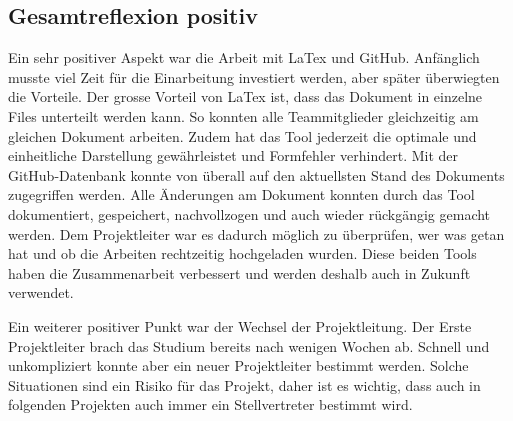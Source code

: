 \subsection{Gesamtreflexion positiv}
\par Ein sehr positiver Aspekt war die Arbeit mit LaTex und GitHub. Anfänglich musste viel Zeit für die Einarbeitung investiert werden, aber später überwiegten die Vorteile. Der grosse Vorteil von LaTex ist, dass das Dokument in einzelne Files unterteilt werden kann. So konnten alle Teammitglieder gleichzeitig am gleichen Dokument arbeiten. Zudem hat das Tool jederzeit die optimale und einheitliche Darstellung gewährleistet und Formfehler verhindert. Mit der GitHub-Datenbank konnte von überall auf den aktuellsten Stand des Dokuments zugegriffen werden. Alle Änderungen am Dokument konnten durch das Tool dokumentiert, gespeichert, nachvollzogen und auch wieder rückgängig gemacht werden. Dem Projektleiter war es dadurch möglich zu überprüfen, wer was getan hat und ob die Arbeiten rechtzeitig hochgeladen wurden. Diese beiden Tools haben die Zusammenarbeit verbessert und werden deshalb auch in Zukunft verwendet.
\par Ein weiterer positiver Punkt war der Wechsel der Projektleitung. Der Erste Projektleiter brach das Studium bereits nach wenigen Wochen ab. Schnell und unkompliziert konnte aber ein neuer Projektleiter bestimmt werden. Solche Situationen sind ein Risiko für das Projekt, daher ist es wichtig, dass auch in folgenden Projekten auch immer ein Stellvertreter bestimmt wird.
